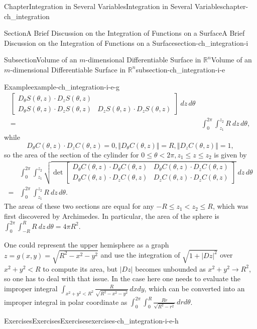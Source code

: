 \documentclass[oneside,10pt,]{book}
\numberwithin{equation}{section}
\newcommand{\bbR}{\mathbb{R}}
\newcommand{\lt}{<}
\newcommand{\amp}{&}
\begin{document}
\begin{chapterptx}{Chapter}{Integration in Several Variables}{}{Integration in Several Variables}{}{}{chapter-ch_integration}
\begin{sectionptx}{Section}{A Brief Discussion on the Integration of Functions on a Surface}{}{A Brief Discussion on the Integration of Functions on a Surface}{}{}{section-ch_integration-i}
\begin{subsectionptx}{Subsection}{Volume of an \(m\)-dimensional Differentiable Surface in \(\bbR^{n}\)}{}{Volume of an \(m\)-dimensional Differentiable Surface in \(\bbR^{n}\)}{}{}{subsection-ch_integration-i-e}
\begin{example}{Example}{}{example-ch_integration-i-e-g}
\begin{align*}
{\begin{bmatrix}
D_{\theta}S(\theta, z) \cdot D_{z}S(\theta, z) \\ D_{\theta}S(\theta, z) \cdot D_{z}S(\theta, z) \amp
D_{z}S(\theta, z) \cdot D_{z}S(\theta, z) \end{bmatrix}}\ dz\, d\theta\\
= \amp \int_{0}^{2\pi} \int_{z_{1}}^{z_{2}} R \ dz\, d\theta, 
\end{align*}
while%
\begin{equation*}
D_{\theta}C(\theta, z)\cdot D_{z}C(\theta, z)=0, \Vert D_{\theta}C(\theta, z)\Vert =R,
\Vert D_{z}C(\theta, z)\Vert=1,
\end{equation*}
so the area of the section of the cylinder for \(0\le \theta \lt 2\pi, z_{1}\le z \le z_{2}\) is given by%
\begin{align*}
\amp \int_{0}^{2\pi} \int_{z_{1}}^{z_{2}} \sqrt{\det \begin{bmatrix} D_{\theta}C(\theta, z)\cdot D_{\theta}C(\theta, z) \amp
D_{\theta}C(\theta, z) \cdot D_{z}C(\theta, z) \\ D_{\theta}C(\theta, z) \cdot D_{z}C(\theta, z) \amp
D_{z}C(\theta, z) \cdot D_{z}C(\theta, z) \end{bmatrix}}\ dz\, d\theta \\
= \amp \int_{0}^{2\pi} \int_{z_{1}}^{z_{2}} R \ dz\, d\theta. 
\end{align*}
The areas of these two sections are equal for any \(-R\le z_{1} \lt z_{2}\le R\), which was first discovered by Archimedes. In particular, the area of the sphere is \(\int_{0}^{2\pi} \int_{-R}^{R} R \ dz\, d\theta=4\pi R^{2}\).%
\par
One could represent the upper hemisphere	as a graph \(z=g(x, y)=\sqrt{R^{2}-x^{2}-y^{2}}\) and use the integration of \(\sqrt{1+|Dz|^{2}}\) over \(x^{2}+y^{2}\lt R\) to compute its area, but \(|Dz|\) becomes unbounded as \(x^{2}+y^{2}\to R^{2}\), so one has to deal with that issue. In the case here one needs to evaluate the improper integral \(\int_{x^{2}+y^{2} \lt R^{2}} \frac{R}{\sqrt{R^{2}-x^{2}-y^{2}}}\, dx dy\), which can be converted into an improper integral in polar coordinate as \(\int_{0}^{2\pi} \int_{0}^{R}\frac{Rr}{\sqrt{R^{2}-r^{2}}}\, dr d\theta\).%
\end{example}
%
%
\typeout{************************************************}
\typeout{************************************************}
%
\begin{exercises-subsubsection-numberless}{Exercises}{Exercises}{}{Exercises}{}{}{exercises-ch_integration-i-e-h}

\end{exercises-subsubsection-numberless}
\end{subsectionptx}
\end{sectionptx}
\end{chapterptx}
\end{document}
